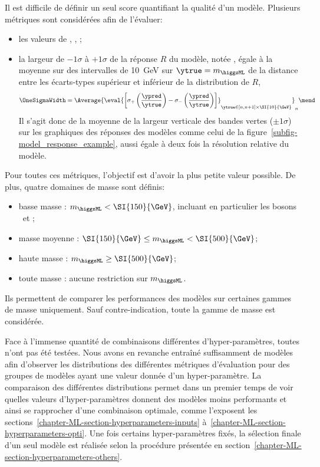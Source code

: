 Il est difficile de définir un seul score quantifiant la qualité d'un modèle.
Plusieurs métriques sont considérées afin de l'évaluer:
\begin{itemize}
\item les valeurs de
\LossMSE,
\LossMAE,
\LossMAPE;
\item la largeur de $-1\sigma$ à $+1\sigma$ de la réponse $R$ du modèle,
notée \OneSigmaWidth,
égale à
la moyenne
sur des intervalles de \SI{10}{\GeV} sur $\ytrue=m_{\higgsML}$
de
la distance entre
les écarts-types supérieur et inférieur
de la distribution de $R$,
\ie
\begin{equation}
\OneSigmaWidth = \Average{\eval{\left[\sigma_+\left(\frac{\ypred}{\ytrue}\right)-\sigma_-\left(\frac{\ypred}{\ytrue}\right)\right]}_{\ytrue\in [n, n+1]\times\SI{10}{\GeV}}}_n
\mend
\end{equation}
Il s'agit donc de la moyenne de la largeur verticale des bandes vertes ($\pm1\sigma$) sur les graphiques des réponses des modèles comme celui de la figure~\ref{subfig-model_response_example},
aussi égale à deux fois la résolution relative du modèle.
\end{itemize}
Pour toutes ces métriques, l'objectif est d'avoir la plus petite valeur possible.
De plus, quatre domaines de masse sont définis:
\begin{itemize}
\item basse masse : $m_{\higgsML} < \SI{150}{\GeV}$, incluant en particulier les bosons \Zboson\ et \higgs;
\item masse moyenne : $\SI{150}{\GeV} \leq m_{\higgsML} < \SI{500}{\GeV}$;
\item haute masse : $m_{\higgsML} \geq \SI{500}{\GeV}$;
\item toute masse : aucune restriction sur $m_{\higgsML}$.
\end{itemize}
Ils permettent de comparer les performances des modèles sur certaines gammes de masse uniquement.
Sauf contre-indication, toute la gamme de masse est considérée.
\par
Face à l'immense quantité de combinaisons différentes d'hyper-paramètres, toutes n'ont pas été testées.
Nous avons en revanche entraîné suffisamment de modèles afin d'observer les distributions des différentes métriques d'évaluation
pour des groupes de modèles ayant une valeur donnée d'un hyper-paramètre.
La comparaison des différentes distributions permet dans un premier temps de
voir quelles valeurs d'hyper-paramètres donnent des modèles moins performants
et ainsi se rapprocher d'une combinaison optimale,
comme l'exposent les sections~\ref{chapter-ML-section-hyperparameters-inputs} à~\ref{chapter-ML-section-hyperparameters-opti}.
Une fois certains hyper-paramètres fixés,
la sélection finale d'un seul modèle est réalisée selon la procédure
présentée en section~\ref{chapter-ML-section-hyperparameters-others}.
